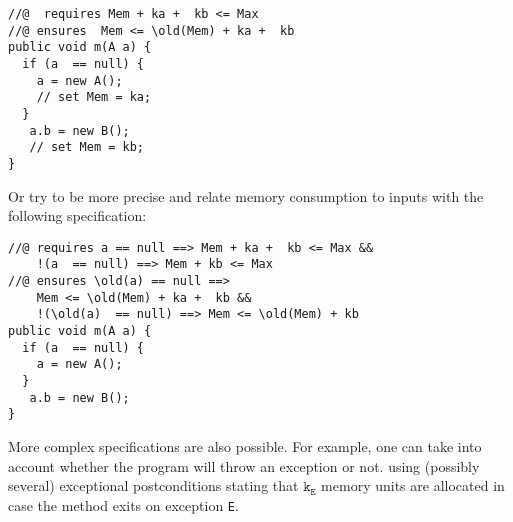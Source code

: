 \begin{lstlisting}[frame=trbl] 
//@  requires Mem + ka +  kb <= Max 
//@ ensures  Mem <= \old(Mem) + ka +  kb     
public void m(A a) {
  if (a  == null) {
    a = new A();
    // set Mem = ka;
  }  
   a.b = new B();
   // set Mem = kb;
}
\end{lstlisting}
Or try to be more precise and relate memory consumption to inputs with
the following specification:
\begin{lstlisting}[frame=trbl] 
//@ requires a == null ==> Mem + ka +  kb <= Max &&	 
    !(a  == null) ==> Mem + kb <= Max
//@ ensures \old(a) == null ==> 
    Mem <= \old(Mem) + ka +  kb && 
    !(\old(a)  == null) ==> Mem <= \old(Mem) + kb    
public void m(A a) {
  if (a  == null) {
    a = new A();
  }  
   a.b = new B();
}
\end{lstlisting}
More complex specifications are also possible. For example, one can
take into account whether the program will throw an exception or not.
using (possibly several) exceptional postconditions stating that
$\texttt{k}_{\texttt{E}}$ memory units are allocated in case the
method exits on exception \texttt{E}.
